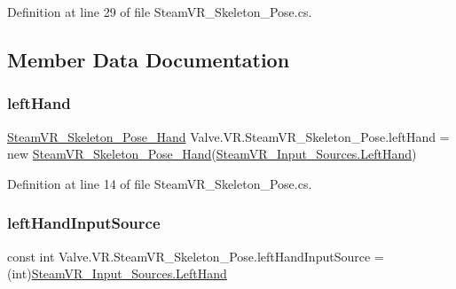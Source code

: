 Definition at line 29 of file Steam\+V\+R\+\_\+\+Skeleton\+\_\+\+Pose.\+cs.



\subsection{Member Data Documentation}
\mbox{\label{class_valve_1_1_v_r_1_1_steam_v_r___skeleton___pose_a12251bc65a0ffc475284ce742b482b61}} 
\subsubsection{\texorpdfstring{leftHand}{leftHand}}
{\footnotesize\ttfamily \mbox{\hyperlink{class_valve_1_1_v_r_1_1_steam_v_r___skeleton___pose___hand}{Steam\+V\+R\+\_\+\+Skeleton\+\_\+\+Pose\+\_\+\+Hand}} Valve.\+V\+R.\+Steam\+V\+R\+\_\+\+Skeleton\+\_\+\+Pose.\+left\+Hand = new \mbox{\hyperlink{class_valve_1_1_v_r_1_1_steam_v_r___skeleton___pose___hand}{Steam\+V\+R\+\_\+\+Skeleton\+\_\+\+Pose\+\_\+\+Hand}}(\mbox{\hyperlink{namespace_valve_1_1_v_r_a82e5bf501cc3aa155444ee3f0662853fa03f7bbbc02c9006ea393ec4ef5843d7b}{Steam\+V\+R\+\_\+\+Input\+\_\+\+Sources.\+Left\+Hand}})}



Definition at line 14 of file Steam\+V\+R\+\_\+\+Skeleton\+\_\+\+Pose.\+cs.

\mbox{\label{class_valve_1_1_v_r_1_1_steam_v_r___skeleton___pose_a0f736b8493f8e11c7fdd3a7e8f28f596}} 
\subsubsection{\texorpdfstring{leftHandInputSource}{leftHandInputSource}}
{\footnotesize\ttfamily const int Valve.\+V\+R.\+Steam\+V\+R\+\_\+\+Skeleton\+\_\+\+Pose.\+left\+Hand\+Input\+Source = (int)\mbox{\hyperlink{namespace_valve_1_1_v_r_a82e5bf501cc3aa155444ee3f0662853fa03f7bbbc02c9006ea393ec4ef5843d7b}{Steam\+V\+R\+\_\+\+Input\+\_\+\+Sources.\+Left\+Hand}}\hspace{0.3cm}{\ttfamily [protected]}}



